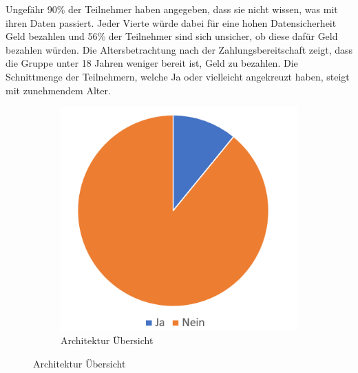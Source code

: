 Ungefähr 90\% der Teilnehmer haben angegeben, dass sie nicht wissen, was mit ihren Daten passiert. Jeder Vierte würde dabei für eine hohen Datensicherheit Geld bezahlen und 56\% der Teilnehmer sind sich unsicher, ob diese dafür Geld bezahlen würden. Die Altersbetrachtung nach der Zahlungsbereitschaft zeigt, dass die Gruppe unter 18 Jahren weniger bereit ist, Geld zu bezahlen. Die Schnittmenge der Teilnehmern, welche Ja oder vielleicht angekreuzt haben, steigt mit zunehmendem Alter.
\begin{figure}[ht!]
	\centering
	\begin{subfigure}{0.45\linewidth}
		\centering
		\includegraphics[width=1\linewidth]{Picture/umfrage_datenschutz}
		\caption[Architektur Übersicht]{Architektur Übersicht}
		\label{fig:umfrage_datenschutz}
	\end{subfigure}
	

\end{figure}
